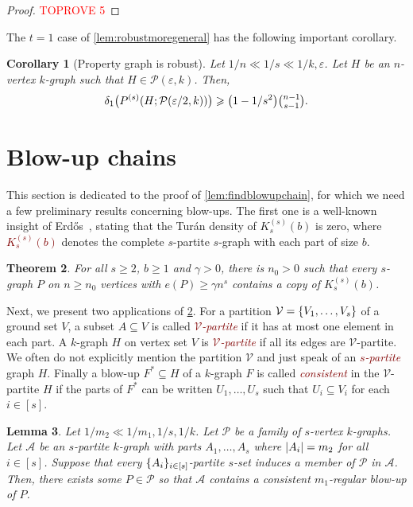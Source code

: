 \documentclass[12pt,reqno]{amsart}
\theoremstyle{plain}
\newtheorem{theorem}{Theorem}[section]
\newtheorem{corollary}[theorem]{Corollary}
\newtheorem{lemma}[theorem]{Lemma}
\theoremstyle{definition}
\numberwithin{equation}{section}
\DeclarePairedDelimiter{\abs}{\lvert}{\rvert}
\DeclarePairedDelimiter{\set}{\{}{\}}
\renewcommand{\geq}{\geqslant}
\renewcommand{\subset}{\subseteq}
\newcommand{\defn}[1]{\textcolor{Maroon}{\emph{#1}}}
\newcommand{\eps}{\varepsilon}
\newcommand{\PG}[3]{{P^{(#3)}}(#1;#2)}
\newcommand{\cA}{\mathcal{A}}
\newcommand{\cP}{\mathcal{P}}
\newcommand{\cV}{\mathcal{V}}
\begin{document}
	\begin{proof}\textcolor{red}{TOPROVE 5}\end{proof}
	
	The $t=1$ case of \cref{lem:robustmoregeneral} has the following important corollary.
	
	\begin{corollary}[Property graph is robust]\label{cor:propgraphrobust}
		Let $1/n\ll 1/s \ll 1/k, \eps$. Let $H$ be an $n$-vertex $k$-graph such that $H\in \cP(\eps,k)$. Then,
		\begin{equation*}
			\delta_1 \bigl(\PG{H}{ \cP(\eps/2,k) }{s} \bigr) \geq \bigl(1-1/s^2 \bigr) \tbinom{n-1}{s-1}.
		\end{equation*}
	\end{corollary}
	
	
	\section{Blow-up chains}\label{sec:blow-up}
	
	This section is dedicated to the proof of \cref{lem:findblowupchain}, for which we need a few preliminary results concerning blow-ups. The first one is a well-known insight of Erd\H{o}s~\cite{Erdos1964hypextremal}, stating that the Tur\'an density of $K_s^{(s)}(b)$ is zero, where \defn{$K_s^{(s)}(b)$} denotes the complete $s$-partite $s$-graph with each part of size $b$.
	
	\begin{theorem}
		\label{thm:erd64}
		For all $s\geq 2$, $b \geq 1$ and $\gamma > 0$, there is $n_0>0$ such that every $s$-graph $P$ on $n\geq n_0$ vertices with $e(P) \geq \gamma n^s$ contains a copy of $K_s^{(s)}(b)$.
	\end{theorem}
	
	Next, we present two applications of \cref{thm:erd64}.
	For a partition $\cV = \set{V_1, \dotsc, V_s}$ of a ground set $V$, a subset $A \subset V$ is called \defn{$\cV$-partite} if it has at most one element in each part.
	A $k$-graph $H$ on vertex set $V$ is \defn{$\cV$-partite} if all its edges are $\cV$-partite.
	We often do not explicitly mention the partition $\cV$ and just speak of an \defn{$s$-partite} graph $H$.
	Finally a blow-up $F^\ast \subset H$ of a $k$-graph $F$ is called \defn{consistent} in the $\cV$-partite $H$ if the parts of $F^\ast$ can be written $U_1, \dotsc, U_s$ such that $U_i \subset V_i$ for each $i \in [s]$.
	
	\begin{lemma}\label{lem:pigeonhole}
		Let $1/m_2 \ll 1/m_1, 1/s, 1/k$.
		Let $\cP$ be a family of $s$-vertex $k$-graphs. Let $\cA$ be an $s$-partite $k$-graph with parts $A_1, \dotsc, A_s$ where $\abs{A_i} = m_2$ for all $i\in[s]$. Suppose that every $\set{A_i}_{i \in [s]}$-partite $s$-set induces a member of $\cP$ in $\cA$. Then, there exists some $P \in \cP$ so that $\mathcal{A}$ contains a consistent $m_1$-regular blow-up of $P$.
	\end{lemma}
	
\end{document}
